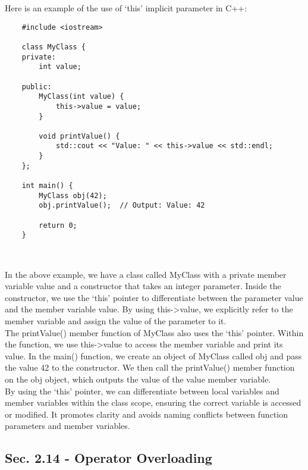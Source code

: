 \begin{solution}
    Here is an example of the use of `this' implicit parameter in C++: \\
    \horizontalline
    \begin{verbatim}
    #include <iostream>

    class MyClass {
    private:
        int value;
    
    public:
        MyClass(int value) {
            this->value = value;
        }
    
        void printValue() {
            std::cout << "Value: " << this->value << std::endl;
        }
    };
    
    int main() {
        MyClass obj(42);
        obj.printValue();  // Output: Value: 42
    
        return 0;
    }
    \end{verbatim} \\
    \horizontalline

    In the above example, we have a class called MyClass with a private member variable value and a constructor that takes an integer parameter. Inside the constructor, we use the `this' pointer to differentiate between the parameter value and the member variable value. By using this->value, we explicitly 
    refer to the member variable and assign the value of the parameter to it. \\

    \noindent The printValue() member function of MyClass also uses the `this' pointer. Within the function, we use this->value to access the member variable and print its value. In the main() function, we create an object of MyClass called obj and pass the value 42 to the constructor. We then call the 
    printValue() member function on the obj object, which outputs the value of the value member variable. \\

    \noindent By using the `this' pointer, we can differentiate between local variables and member variables within the class scope, ensuring the correct variable is accessed or modified. It promotes clarity and avoids naming conflicts between function parameters and member variables. \\
\end{solution}

\subsection*{Sec. 2.14 - Operator Overloading}
